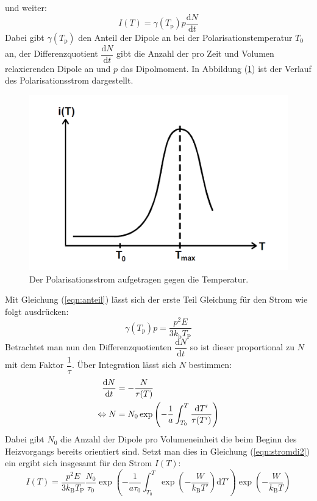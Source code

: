 und weiter:
\begin{equation}
  \label{eqn:stromdichte}
  I(T)=\gamma(T_\mathrm{p})p\dfrac{\mathrm{d} N}{\mathrm{d} t}
\end{equation}
Dabei gibt $\gamma(T_\mathrm{p})$ den Anteil der Dipole an bei der Polarisationstemperatur $T_\mathrm{0}$ an, der Differenzquotient $\dfrac{\mathrm{d} N}{\mathrm{d} t}$ gibt die Anzahl der pro Zeit und Volumen relaxierenden Dipole an und
$p$ das Dipolmoment. In Abbildung (\ref{fig:stromdi}) ist der Verlauf des Polarisationsstrom dargestellt.
\begin{figure}[h!]
  \centering
  \includegraphics[scale=0.5]{fig/stromver.png}
  \caption{Der Polarisationsstrom aufgetragen gegen die Temperatur.}
  \label{fig:stromdi}
\end{figure}
Mit Gleichung (\ref{eqn:anteil}) lässt sich der erste Teil Gleichung für den Strom wie folgt ausdrücken:
\begin{equation}
  \label{eqn:stromdi2}
  \gamma(T_\mathrm{p})p=\dfrac{p^2E}{3 k_\mathrm{b} T_\mathrm{P}}
\end{equation}
Betrachtet man nun den Differenzquotienten $\dfrac{\mathrm{d} N}{\mathrm{d} t}$ so ist dieser proportional zu $N$ mit dem Faktor $\dfrac{1}{\tau}$. Über Integration lässt sich $N$ bestimmen:
\begin{align}
  \dfrac{\mathrm{d} N}{\mathrm{d} t}&=-\dfrac{N}{\tau(T)} \notag \\
  \label{eqn:einset}
  \Leftrightarrow N&=N_\mathrm{0}\exp\left(-\dfrac{1}{a}\int_{T_0}^T\dfrac{\mathrm{d} T'}{\tau(T')}\right)
\end{align}
Dabei gibt $N_\mathrm{0}$ die Anzahl der Dipole pro Volumeneinheit die beim Beginn des Heizvorgangs bereits orientiert sind. Setzt man dies in Gleichung (\ref{eqn:stromdi2}) ein ergibt sich insgesamt für den Strom $I(T)$:
\begin{equation}
  \label{eqn:stromdi3}
  I(T) = \dfrac{p^2 E}{3k_\mathrm{B}T_\mathrm{P}}\dfrac{N_\mathrm{0}}{\tau_\mathrm{0}} \exp{\left(-\dfrac{1}{a\tau_\mathrm{0}}\int_{T_0}^T\exp{\left(-\dfrac{W}{k_\mathrm{B}T'}\right)\mathrm{d}T'}\right)}\exp{\left(-\dfrac{W}{ k_\mathrm{B}T}\right)}
\end{equation}
